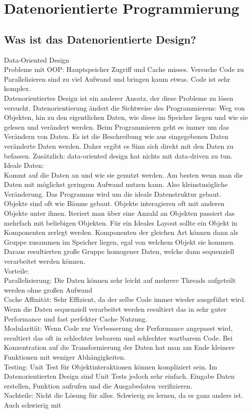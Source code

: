 \section{Datenorientierte Programmierung}
\subsection{Was ist das Datenorientierte Design?}
Data-Oriented Design \cite{Data-OrientedDesign}\\
Probleme mit OOP: Hauptspeicher Zugriff und Cache misses. Versuche Code zu Parallelisieren sind zu viel Aufwand und bringen kaum etwas. Code ist sehr komplex.\\Datenorientiertes Design ist ein anderer Ansatz, der diese Probleme zu lösen versucht. Datenorientierung ändert die Sichtweise des Programmierens: Weg von Objekten, hin zu den eigentlichen Daten, wie diese im Speicher liegen und wie sie gelesen und verändert werden. Beim Programmieren geht es immer um das Verändern von Daten. Es ist die Beschreibung wie aus eingegebenen Daten veränderte Daten werden. Daher ergibt es Sinn sich direkt mit den Daten zu befassen. Zusätzlich: \glqq data-oriented design\grqq{}  hat nichts mit \glqq data-driven\grqq{} zu tun.\\ Ideale Daten:\\Kommt auf die Daten an und wie sie genutzt werden. Am besten wenn man die Daten mit möglichst geringem Aufwand nutzen kann. Also kleinstmögliche Veränderung. Das Programms wird um die ideale Datenstruktur gebaut.\\Objekte sind oft wie Bäume gebaut. Objekte interagieren oft mit anderen Objekte \glqq unter\grqq{} ihnen. Iteriert man über eine Anzahl an Objekten passiert das mehrfach mit beliebigen Objekten. Für ein Ideales Layout sollte ein Objekt in Komponenten zerlegt werden. Komponenten der gleichen Art können dann als Gruppe zusammen im Speicher liegen, egal von welchem Objekt sie kommen. Daraus resultierten große Gruppe homogener Daten, welche dann sequenziell verarbeitet werden können.\\Vorteile:\\Parallelisierung: Die Daten können sehr leicht auf mehrere Threads aufgeteilt werden ohne großen Aufwand\\Cache Affinität: Sehr Effizient, da der selbe Code immer wieder ausgeführt wird. Wenn die Daten sequenziell verarbeitet werden resultiert das in sehr guter Performance und fast perfekter Cache Nutzung.\\Modularität: Wenn Code zur Verbesserung der Performance angepasst wird, resultiert das oft in schlechter lesbarem und schlechter wartbarem Code. Bei Konzentration auf die Transformierung der Daten hat man am Ende kleinere Funktionen mit weniger Abhängigkeiten.\\Testing: Unit Test für Objektinteraktionen können kompliziert sein. Im Datenorientierten Design sind Unit Tests jedoch sehr einfach. Eingabe Daten erstellen, Funktion aufrufen und die Ausgabedaten verifizieren.\\Nachteile: Nicht die Lösung für alles. Schwierig zu lernen, da es ganz anders ist. Auch schwierig mit 